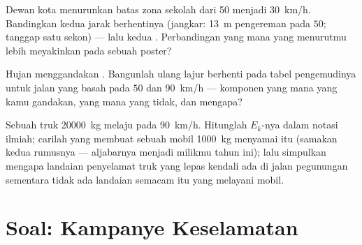 \begin{exercise}[$\star\star$]\label{exo:g9:kinetic-energy-safety:10}
Dewan kota menurunkan batas  zona sekolah dari \qty{50}{}
menjadi \qty{30}{km/h}. Bandingkan kedua jarak berhentinya (jangkar:
\qty{13}{m} pengereman pada $50$; tanggap satu sekon) --- lalu kedua
. Perbandingan yang mana yang menurutmu lebih
meyakinkan pada sebuah poster?
\end{exercise}

\begin{exercise}[$\star\star$]\label{exo:g9:kinetic-energy-safety:11}
Hujan menggandakan . Bangunlah ulang lajur berhenti
pada tabel pengemudinya untuk jalan yang basah pada $50$ dan
\qty{90}{km/h} --- komponen yang mana yang kamu gandakan, yang mana
yang tidak, dan mengapa?
\end{exercise}

\begin{exercise}[$\star\star\star$]\label{exo:g9:kinetic-energy-safety:12}
Sebuah truk \qty{20000}{kg} melaju pada \qty{90}{km/h}. Hitunglah
$E_k$-nya dalam notasi ilmiah; carilah  yang membuat sebuah
mobil \qty{1000}{kg} menyamai  itu (samakan kedua rumusnya ---
aljabarnya menjadi milikmu tahun ini); lalu simpulkan mengapa landaian
penyelamat truk yang lepas kendali ada di jalan pegunungan sementara
tidak ada landaian semacam itu yang melayani mobil.
\end{exercise}

\section{Soal: Kampanye Keselamatan}

